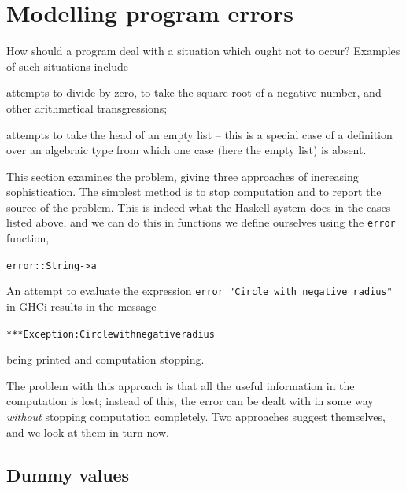 \section{Modelling program errors}
\label{progErrs}

\noindent
How should a program deal with a situation which ought not to occur? Examples
of such situations include
\begin{titemize}
\item attempts to divide by zero, to take the square root of a negative
number, and other arithmetical transgressions;
\item attempts to take the head of an empty list -- this is a special case
of a definition over an algebraic type from which one case (here the empty
list) is absent.
\end{titemize}
This section examines the problem, giving three approaches of increasing
sophistication. The simplest method is to stop computation  and to report the
source of  the problem. This is indeed what the Haskell system does in the
cases listed above, and we can do this in functions we define ourselves using
the \texttt{error} function,
\begin{alltt}
error :: String -> a
\end{alltt}
An attempt to evaluate the expression 
\texttt{error "Circle with negative radius"}
in GHCi results in the message 
\begin{alltt}
*** Exception: Circle with negative radius
\end{alltt}
being printed and computation stopping.

The problem with this approach is that all the useful information in the
computation is lost; instead of this, the error can be dealt with in some way
{\em without\/} stopping computation completely. Two approaches suggest
themselves, and we look at them in turn now.

\subsection*{Dummy values}

